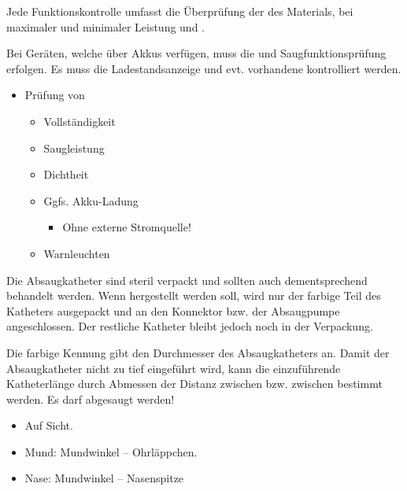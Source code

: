 {
Jede Funktionskontrolle umfasst die Überprüfung der des
Materials,  bei maximaler und minimaler Leistung und
.

Bei Geräten, welche über Akkus verfügen, muss die  und
Saugfunktionsprüfung 
erfolgen. Es muss die Ladestandsanzeige und evt. vorhandene 
kontrolliert werden. 
}{
\begin{itemize}
   \item Prüfung von
   \begin{itemize}
      \item Vollständigkeit
      \item Saugleistung
      \item Dichtheit
      \item Ggfs. Akku-Ladung
      \begin{itemize}
         \item Ohne externe Stromquelle!
      \end{itemize}
      \item Warnleuchten
   \end{itemize}
\end{itemize}
}{}{}{}

{
Die Absaugkatheter sind steril verpackt und sollten
auch dementsprechend behandelt werden. Wenn 
 hergestellt werden soll, wird nur
der farbige Teil des Katheters ausgepackt und an den
Konnektor bzw. der Absaugpumpe angeschlossen.
Der restliche Katheter bleibt jedoch noch in der Verpackung. 

Die farbige Kennung gibt
den Durchmesser des Absaugkatheters an. Damit der
Absaugkatheter nicht zu tief eingeführt wird, kann die
einzuführende Katheterlänge durch Abmessen der Distanz
zwischen  bzw. zwischen  bestimmt werden. Es darf  abgesaugt
werden! }{
\begin{itemize}
    \item Auf Sicht.
    \item Mund: Mundwinkel -- Ohrläppchen.
    \item Nase: Mundwinkel -- Nasenspitze
\end{itemize}
}
{}
{}
{}


